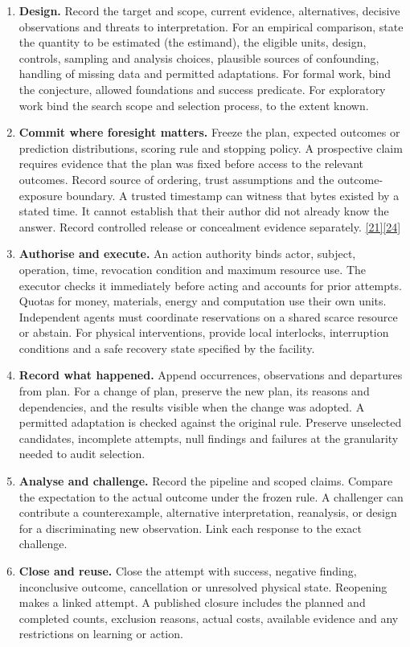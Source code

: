 \documentclass[11pt,a4paper]{article}
\newcommand{\src}[1]{\hyperlink{ref#1}{[#1]}}
\begin{document}
\begin{enumerate}
\item \textbf{Design.} Record the target and scope, current evidence, alternatives, decisive observations and threats to interpretation. For an empirical comparison, state the quantity to be estimated (the estimand), the eligible units, design, controls, sampling and analysis choices, plausible sources of confounding, handling of missing data and permitted adaptations. For formal work, bind the conjecture, allowed foundations and success predicate. For exploratory work bind the search scope and selection process, to the extent known.
\item \textbf{Commit where foresight matters.} Freeze the plan, expected outcomes or prediction distributions, scoring rule and stopping policy. A prospective claim requires evidence that the plan was fixed before access to the relevant outcomes. Record source of ordering, trust assumptions and the outcome-exposure boundary. A trusted timestamp can witness that bytes existed by a stated time. It cannot establish that their author did not already know the answer. Record controlled release or concealment evidence separately. \src{21}\src{24}
\item \textbf{Authorise and execute.} An action authority binds actor, subject, operation, time, revocation condition and maximum resource use. The executor checks it immediately before acting and accounts for prior attempts. Quotas for money, materials, energy and computation use their own units. Independent agents must coordinate reservations on a shared scarce resource or abstain. For physical interventions, provide local interlocks, interruption conditions and a safe recovery state specified by the facility.
\item \textbf{Record what happened.} Append occurrences, observations and departures from plan. For a change of plan, preserve the new plan, its reasons and dependencies, and the results visible when the change was adopted. A permitted adaptation is checked against the original rule. Preserve unselected candidates, incomplete attempts, null findings and failures at the granularity needed to audit selection.
\item \textbf{Analyse and challenge.} Record the pipeline and scoped claims. Compare the expectation to the actual outcome under the frozen rule. A challenger can contribute a counterexample, alternative interpretation, reanalysis, or design for a discriminating new observation. Link each response to the exact challenge.
\item \textbf{Close and reuse.} Close the attempt with success, negative finding, inconclusive outcome, cancellation or unresolved physical state. Reopening makes a linked attempt. A published closure includes the planned and completed counts, exclusion reasons, actual costs, available evidence and any restrictions on learning or action.
\end{enumerate}
\end{document}
